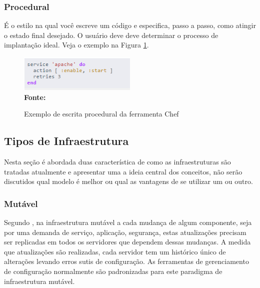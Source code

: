  \subsubsection{Procedural}
  
  É o estilo na qual você escreve um código e especifica, passo a passo, como atingir o estado final desejado. O usuário deve deve determinar o processo de implantação ideal. Veja o exemplo na Figura \ref{fig:figura1}.

\begin{figure}[ht]
	\centering	
	\caption[\hspace{0.1cm}Exemplo procedural]{Exemplo de escrita procedural da ferramenta Chef}
	\vspace{-0.4cm}
	\includegraphics[width=0.5\textwidth]{figuras/chef-io-exemplo-procedural.png}
	 \vspace{-0.2cm}
	\\\textbf{\footnotesize Fonte: \cite{chef01}}
	\label{fig:figura1}
\end{figure}
\vspace{-0.5cm}

 \subsection{Tipos de Infraestrutura}
 
 Nesta seção é abordada duas característica de como as infraestruturas são tratadas atualmente e apresentar uma a ideia central dos conceitos, não serão discutidos qual modelo é melhor ou qual as vantagens de se utilizar um ou outro. 

\subsubsection{Mutável}
 Segundo \cite{Morris:2016:ICM:3006361}, na infraestrutura mutável a cada mudança de algum componente, seja por uma demanda de serviço, aplicação, segurança, estas atualizações precisam ser replicadas em todos os servidores que dependem dessas mudanças. A medida que atualizações são realizadas, cada servidor tem um histórico único de alterações levando erros sutis de configuração. As ferramentas de gerenciamento de configuração normalmente são padronizadas para este paradigma de infraestrutura mutável. 
 

